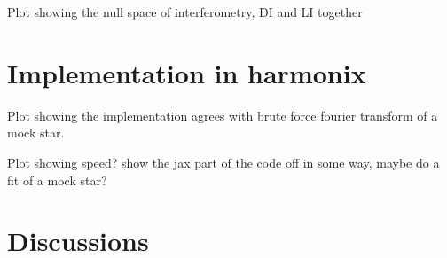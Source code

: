 \documentclass[modern]{aastex631}
\begin{document}
Plot showing the null space of interferometry, DI and LI together
\section{Implementation in harmonix}
\label{sec:harmonix}
Plot showing the implementation agrees with brute force fourier transform of a mock star. 

Plot showing speed? show the jax part of the code off in some way, maybe do a fit of a mock star?
\section{Discussions}
\label{sec:discussions}


\end{document}
